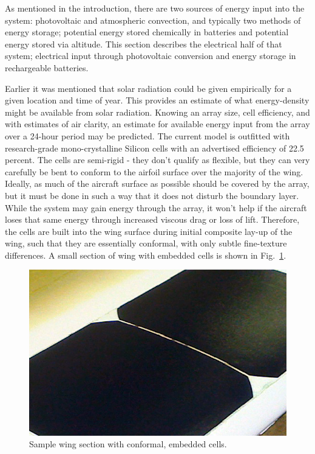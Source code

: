 \documentclass{ifacconf}
\begin{document}
As mentioned in the introduction, there are two sources of energy input into the system: photovoltaic and atmospheric convection, and typically two methods of energy storage; potential energy stored chemically in batteries and potential energy stored via altitude. This section describes the electrical half of that system; electrical input through photovoltaic conversion and energy storage in rechargeable batteries.

Earlier it was mentioned that solar radiation could be given empirically for a given location and time of year. This provides an estimate of what energy-density might be available from solar radiation. Knowing an array size, cell efficiency, and with estimates of air clarity, an estimate for available energy input from the array over a 24-hour period may be predicted. The current model is outfitted with research-grade mono-crystalline Silicon cells with an advertised efficiency of 22.5 percent. The cells are semi-rigid - they don't qualify as flexible, but they can very carefully be bent to conform to the airfoil surface over the majority of the wing. Ideally, as much of the aircraft surface as possible should be covered by the array, but it must be done in such a way that it does not disturb the boundary layer. While the system may gain energy through the array, it won't help if the aircraft loses that same energy through increased viscous drag or loss of lift. Therefore, the cells are built into the wing surface during initial composite lay-up of the wing, such that they are essentially conformal, with only subtle fine-texture differences. A small section of wing with embedded cells is shown in Fig.~\ref{fig:wing_sample}.

\begin{figure}[thpb]
  \centering
  \includegraphics[scale=1.2]{Figures/IMG_3502.eps}
  \caption{Sample wing section with conformal, embedded cells.}
  \label{fig:wing_sample}
\end{figure}
\end{document}
